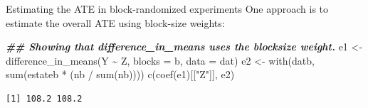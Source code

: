 \documentclass[
  ignorenonframetext,
]{beamer}
\newenvironment{Shaded}{\begin{snugshade}}{\end{snugshade}}
\newcommand{\AttributeTok}[1]{\textcolor[rgb]{0.77,0.63,0.00}{#1}}
\newcommand{\DocumentationTok}[1]{\textcolor[rgb]{0.56,0.35,0.01}{\textbf{\textit{#1}}}}
\newcommand{\FunctionTok}[1]{\textcolor[rgb]{0.00,0.00,0.00}{#1}}
\newcommand{\NormalTok}[1]{#1}
\newcommand{\OtherTok}[1]{\textcolor[rgb]{0.56,0.35,0.01}{#1}}
\newcommand{\SpecialCharTok}[1]{\textcolor[rgb]{0.00,0.00,0.00}{#1}}
\newcommand{\StringTok}[1]{\textcolor[rgb]{0.31,0.60,0.02}{#1}}
\begin{document}
\begin{frame}[fragile]{Estimating the ATE in block-randomized
experiments}
\protect\hypertarget{estimating-the-ate-in-block-randomized-experiments-2}{}
One approach is to estimate the overall ATE using block-size weights:

\scriptsize

\begin{Shaded}
\begin{Highlighting}[]
\DocumentationTok{\#\# Showing that difference\_in\_means uses the blocksize weight.}
\NormalTok{e1 }\OtherTok{\textless{}{-}} \FunctionTok{difference\_in\_means}\NormalTok{(Y }\SpecialCharTok{\textasciitilde{}}\NormalTok{ Z, }\AttributeTok{blocks =}\NormalTok{ b, }\AttributeTok{data =}\NormalTok{ dat)}
\NormalTok{e2 }\OtherTok{\textless{}{-}} \FunctionTok{with}\NormalTok{(datb, }\FunctionTok{sum}\NormalTok{(estateb }\SpecialCharTok{*}\NormalTok{ (nb }\SpecialCharTok{/} \FunctionTok{sum}\NormalTok{(nb))))}
\FunctionTok{c}\NormalTok{(}\FunctionTok{coef}\NormalTok{(e1)[[}\StringTok{"Z"}\NormalTok{]], e2)}
\end{Highlighting}
\end{Shaded}

\begin{verbatim}
[1] 108.2 108.2
\end{verbatim}

\normalsize
\end{frame}
\end{document}
